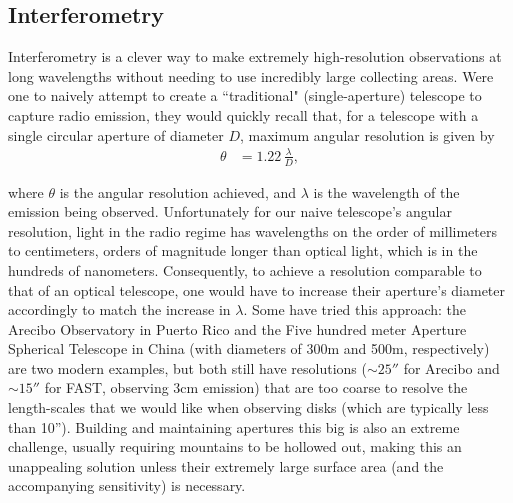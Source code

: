 \subsection{Interferometry}
\label{section:interferometry}
Interferometry is a clever way to make extremely high-resolution observations at long wavelengths without needing to use incredibly large collecting areas. Were one to naively attempt to create a ``traditional" (single-aperture) telescope to capture radio emission, they would quickly recall that, for a telescope with a single circular aperture of diameter $D$, maximum angular resolution is given by
\begin{align}
  \theta &= 1.22 \, \frac{\lambda}{D},
\end{align}

\noindent where $\theta$ is the angular resolution achieved, and $\lambda$ is the wavelength of the emission being observed. Unfortunately for our naive telescope's angular resolution, light in the radio regime has wavelengths on the order of millimeters to centimeters, orders of magnitude longer than optical light, which is in the hundreds of nanometers. Consequently, to achieve a resolution comparable to that of an optical telescope, one would have to increase their aperture's diameter accordingly to match the increase in $\lambda$. Some have tried this approach: the Arecibo Observatory in Puerto Rico and the Five hundred meter Aperture Spherical Telescope in China (with diameters of 300m and 500m, respectively) are two modern examples, but both still have resolutions ($\sim25''$ for Arecibo and $\sim15''$ for FAST, observing 3cm emission) that are too coarse to resolve the length-scales that we would like when observing disks (which are typically less than 10''). Building and maintaining apertures this big is also an extreme challenge, usually requiring mountains to be hollowed out, making this an unappealing solution unless their extremely large surface area (and the accompanying sensitivity) is necessary.


